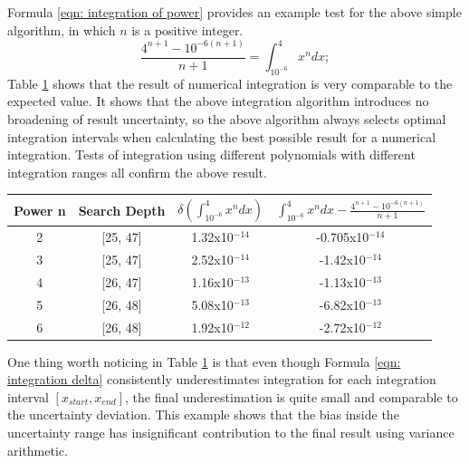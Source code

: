 \documentclass[twoside]{article}
\numberwithin{equation}{section}
\begin{document}
Formula \eqref{eqn: integration of power} provides an example test for the above simple algorithm, in which $n$ is a positive integer.  
\begin{equation}
\label{eqn: integration of power}
\frac{4^{n+1} - 10^{-6(n+1)}}{n+1} = \int _{10^{-6}}^{4} x^{n} dx;
\end{equation}
Table \ref{tab: numerical integration} shows that the result of numerical integration is very comparable to the expected value.  It shows that the above integration algorithm introduces no broadening of result uncertainty, so the above algorithm always selects optimal integration intervals when calculating the best possible result for a numerical integration.  Tests of integration using different polynomials with different integration ranges all confirm the above result.

\begin{table}[h]
\centering
\begin{tabular}{|c|c|c|c|} 
\hline 
Power n & Search Depth & $\delta \left( \int _{10^{-6} }^{4}x^{n} dx \right) $ & $\int _{10^{-6} }^{4}x^{n} dx -\frac{4^{n+1} -10^{-6(n+1)} }{n+1} $ \\ 
\hline 
2 & [25, 47] & 1.32x10${}^{-14}$ & -0.705x10${}^{-14}$ \\ 
\hline 
3 & [25, 47] & 2.52x10${}^{-14}$  & -1.42x10${}^{-14}$ \\ 
\hline 
4 & [26, 47] & 1.16x10${}^{-13}$ & -1.13x10${}^{-13}$ \\ 
\hline 
5 & [26, 48] & 5.08x10${}^{-13}$ & -6.82x10${}^{-13}$ \\ 
\hline 
6 & [26, 48] & 1.92x10${}^{-12}$ & -2.72x10${}^{-12}$ \\ 
\hline 
\end{tabular}
\label{tab: numerical integration}
\end{table}

One thing worth noticing in Table \ref{tab: numerical integration} is that even though Formula \eqref{eqn: integration delta} consistently underestimates integration for each integration interval $[x_{start}, x_{end}]$, the final underestimation is quite small and comparable to the uncertainty deviation.  This example shows that the bias inside the uncertainty range has insignificant contribution to the final result using variance arithmetic.
\end{document}
